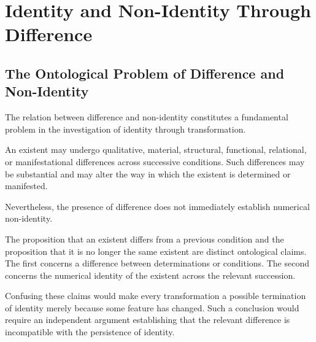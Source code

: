 %
%

\section{Identity and Non-Identity Through Difference}
\label{sec:identity-and-non-identity-through-difference}

\subsection{The Ontological Problem of Difference and Non-Identity}

The relation between difference and non-identity constitutes
a fundamental problem in the investigation of identity
through transformation.

An existent may undergo qualitative, material, structural,
functional, relational, or manifestational differences
across successive conditions. Such differences may be
substantial and may alter the way in which the existent
is determined or manifested.

Nevertheless, the presence of difference does not
immediately establish numerical non-identity.

The proposition that an existent differs from a previous
condition and the proposition that it is no longer
the same existent are distinct ontological claims.
The first concerns a difference between determinations
or conditions. The second concerns the numerical identity
of the existent across the relevant succession.

Confusing these claims would make every transformation
a possible termination of identity merely because
some feature has changed. Such a conclusion would
require an independent argument establishing that
the relevant difference is incompatible with the
persistence of identity.

